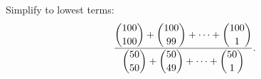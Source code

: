 Simplify to lowest terms:
\[\dfrac{\dbinom{100}{100}+\dbinom{100}{99}+\cdots+\dbinom{100}{1}}{\dbinom{50}{50}+\dbinom{50}{49}+\cdots+\dbinom{50}{1}}.\]
